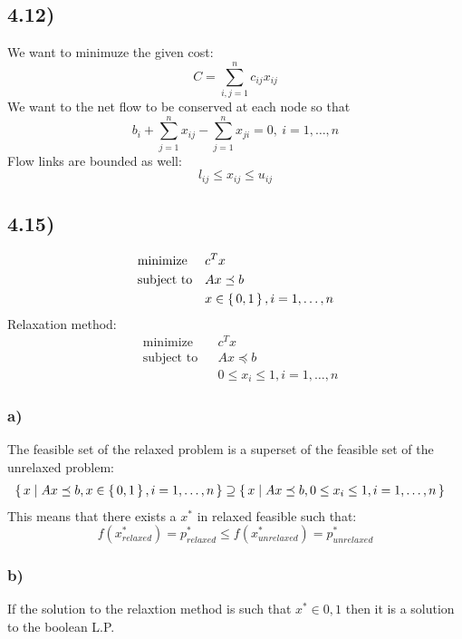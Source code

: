 \documentclass[12pt]{article}
\begin{document}
\subsection*{4.12)}

We want to minimuze the given cost: 
$$C = \sum_{i,j=1}^{n}c_{ij}x_{ij}$$
We want to the net flow to be conserved at each node so that 
$$b_i + \sum_{j=1}^{n}x_{ij}-\sum_{j=1}^{n}x_{ji}=0,\ i=1,\dots ,n$$
Flow links are bounded as well: 
$$l_{ij}\le x_{ij} \le u_{ij}$$

\subsection*{4.15)}

\begin{equation*}
\begin{aligned}
& {\text{minimize}}
& & c^Tx\\
& \text{subject to}
& & Ax \preceq b\\
&&& x \in \set{0,1}, i=1,\dots,n
\end{aligned}
\end{equation*}
Relaxation method:
\begin{equation*}
\begin{aligned}
& {\text{minimize}}
& & c^Tx\\
& \text{subject to}
& & Ax \preceq b\\
&&& 0 \le x_i \le 1, i=1,\dots,n
\end{aligned}
\end{equation*}

\subsubsection*{a)}
The feasible set of the relaxed problem is a superset of the feasible set of the unrelaxed problem:
\begin{equation*}
\begin{aligned}
& \set{x | Ax \preceq b, x \in \set{0,1}, i=1,\dots,n} \supseteq \set{x | Ax \preceq b, 0 \le x_i \le 1, i=1,\dots,n}
\end{aligned}
\end{equation*}
This means that there exists a $x^*$ in relaxed feasible such that:
$$f(x^*_{relaxed})=p^*_{relaxed} \le f(x^*_{unrelaxed})=p^*_{unrelaxed}$$

\subsubsection*{b)}
If the solution to the relaxtion method is such that $x^* \in {0,1}$ then it is a solution to the boolean L.P.
\end{document}
